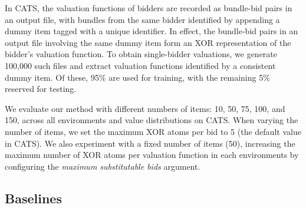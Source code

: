 In CATS, the valuation functions of bidders are recorded as bundle-bid pairs in an output file, with bundles from the same bidder identified by appending a dummy item tagged with a unique identifier. In effect, the bundle-bid pairs in an output file involving the same dummy item form an XOR representation of the bidder's valuation function. 
To obtain single-bidder valuations, we generate 100,000 such files and  extract valuation functions identified by a consistent dummy item. Of these, 95\% are used for training, with the remaining 5\% reserved for testing.


We evaluate our method with different numbers of items: 10, 50, 75, 100, and 150, across all environments and value distributions on CATS. When varying the number of items, we set the maximum XOR atoms per bid to 5 (the default value in CATS). We also experiment with a fixed number of items (50), increasing the maximum number of XOR atoms per valuation function in each environments by configuring the  \emph{maximum substitutable bids} argument.

\subsection{Baselines}

